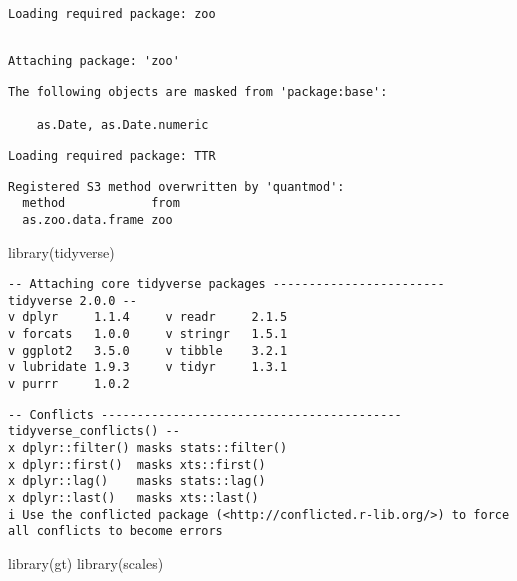 \documentclass[
  letterpaper,
  DIV=11,
  numbers=noendperiod]{scrartcl}
\newenvironment{Shaded}{\begin{snugshade}}{\end{snugshade}}
\newcommand{\FunctionTok}[1]{\textcolor[rgb]{0.28,0.35,0.67}{#1}}
\newcommand{\NormalTok}[1]{\textcolor[rgb]{0.00,0.23,0.31}{#1}}
\begin{document}
\begin{verbatim}
Loading required package: zoo
\end{verbatim}

\begin{verbatim}

Attaching package: 'zoo'
\end{verbatim}

\begin{verbatim}
The following objects are masked from 'package:base':

    as.Date, as.Date.numeric
\end{verbatim}

\begin{verbatim}
Loading required package: TTR
\end{verbatim}

\begin{verbatim}
Registered S3 method overwritten by 'quantmod':
  method            from
  as.zoo.data.frame zoo 
\end{verbatim}

\begin{Shaded}
\begin{Highlighting}[]
\FunctionTok{library}\NormalTok{(tidyverse)}
\end{Highlighting}
\end{Shaded}

\begin{verbatim}
-- Attaching core tidyverse packages ------------------------ tidyverse 2.0.0 --
v dplyr     1.1.4     v readr     2.1.5
v forcats   1.0.0     v stringr   1.5.1
v ggplot2   3.5.0     v tibble    3.2.1
v lubridate 1.9.3     v tidyr     1.3.1
v purrr     1.0.2     
\end{verbatim}

\begin{verbatim}
-- Conflicts ------------------------------------------ tidyverse_conflicts() --
x dplyr::filter() masks stats::filter()
x dplyr::first()  masks xts::first()
x dplyr::lag()    masks stats::lag()
x dplyr::last()   masks xts::last()
i Use the conflicted package (<http://conflicted.r-lib.org/>) to force all conflicts to become errors
\end{verbatim}

\begin{Shaded}
\begin{Highlighting}[]
\FunctionTok{library}\NormalTok{(gt)}
\FunctionTok{library}\NormalTok{(scales)}
\end{Highlighting}
\end{Shaded}
\end{document}
